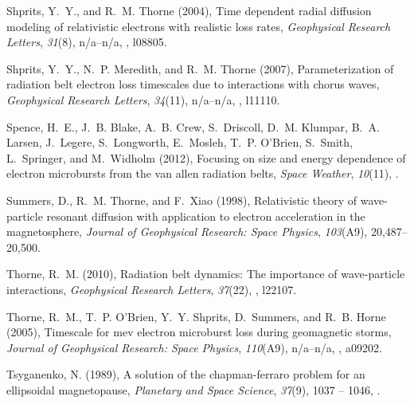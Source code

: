 \documentclass[draft, linenumbers]{agujournal}
\begin{document}
\begin{thebibliography}{49}
Shprits, Y.~Y., and R.~M. Thorne (2004), Time dependent radial diffusion
  modeling of relativistic electrons with realistic loss rates,
  \textit{Geophysical Research Letters}, \textit{31}(8), n/a--n/a,
  , l08805.

Shprits, Y.~Y., N.~P. Meredith, and R.~M. Thorne (2007), Parameterization of
  radiation belt electron loss timescales due to interactions with chorus
  waves, \textit{Geophysical Research Letters}, \textit{34}(11), n/a--n/a,
  , l11110.

Spence, H.~E., J.~B. Blake, A.~B. Crew, S.~Driscoll, D.~M. Klumpar, B.~A.
  Larsen, J.~Legere, S.~Longworth, E.~Mosleh, T.~P. O'Brien, S.~Smith,
  L.~Springer, and M.~Widholm (2012), Focusing on size and energy dependence of
  electron microbursts from the van allen radiation belts, \textit{Space
  Weather}, \textit{10}(11), .

Summers, D., R.~M. Thorne, and F.~Xiao (1998), Relativistic theory of
  wave-particle resonant diffusion with application to electron acceleration in
  the magnetosphere, \textit{Journal of Geophysical Research: Space Physics},
  \textit{103}(A9), 20,487--20,500.

Thorne, R.~M. (2010), Radiation belt dynamics: The importance of wave-particle
  interactions, \textit{Geophysical Research Letters}, \textit{37}(22),
  , l22107.

Thorne, R.~M., T.~P. O'Brien, Y.~Y. Shprits, D.~Summers, and R.~B. Horne
  (2005), Timescale for mev electron microburst loss during geomagnetic storms,
  \textit{Journal of Geophysical Research: Space Physics}, \textit{110}(A9),
  n/a--n/a, , a09202.

Tsyganenko, N. (1989), A solution of the chapman-ferraro problem for an
  ellipsoidal magnetopause, \textit{Planetary and Space Science},
  \textit{37}(9), 1037 -- 1046,
  .


\end{thebibliography}
\end{document}
